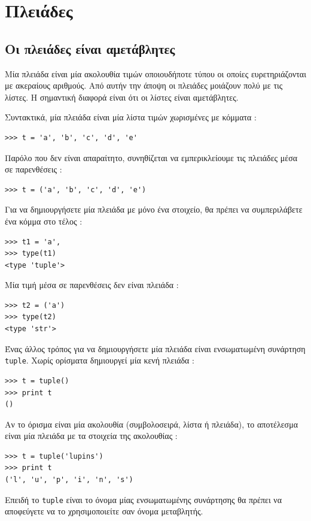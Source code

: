 \documentclass[10pt]{book}
\begin{document}
 
 
\chapter{Πλειάδες}
\label{tuplechap}

\section{Οι πλειάδες είναι αμετάβλητες}

Μία πλειάδα είναι μία ακολουθία τιμών οποιουδήποτε τύπου οι οποίες ευρετηριάζονται με  ακεραίους αριθμούς. Από αυτήν την άποψη οι πλειάδες μοιάζουν πολύ με τις λίστες. Η σημαντική διαφορά είναι ότι οι λίστες είναι αμετάβλητες. 

Συντακτικά, μία πλειάδα είναι μία λίστα τιμών χωρισμένες με κόμματα :

\begin{verbatim}
>>> t = 'a', 'b', 'c', 'd', 'e'
\end{verbatim}
%
 Παρόλο που δεν είναι απαραίτητο, συνηθίζεται να εμπερικλείουμε τις πλειάδες μέσα σε παρενθέσεις :

\begin{verbatim}
>>> t = ('a', 'b', 'c', 'd', 'e')
\end{verbatim}
%
 Για να δημιουργήσετε μία πλειάδα με μόνο ένα στοιχείο, θα πρέπει να συμπεριλάβετε ένα κόμμα στο τέλος :

\begin{verbatim}
>>> t1 = 'a',
>>> type(t1)
<type 'tuple'>
\end{verbatim}
%
 Μία τιμή μέσα σε παρενθέσεις δεν είναι πλειάδα :

\begin{verbatim}
>>> t2 = ('a')
>>> type(t2)
<type 'str'>
\end{verbatim}
%
 Ένας άλλος τρόπος για να δημιουργήσετε μία πλειάδα είναι ενσωματωμένη συνάρτηση  {\tt tuple}.  Χωρίς ορίσματα δημιουργεί μία κενή πλειάδα :

\begin{verbatim}
>>> t = tuple()
>>> print t
()
\end{verbatim}
%
 Αν το όρισμα είναι μία ακολουθία (συμβολοσειρά, λίστα ή πλειάδα), το αποτέλεσμα είναι μία πλειάδα με τα στοιχεία της ακολουθίας :

\begin{verbatim}
>>> t = tuple('lupins')
>>> print t
('l', 'u', 'p', 'i', 'n', 's')
\end{verbatim}
%
 Επειδή το  {\tt tuple}  είναι το όνομα μίας ενσωματωμένης συνάρτησης θα πρέπει να αποφεύγετε να το χρησιμοποιείτε σαν όνομα μεταβλητής.
\end{document}
